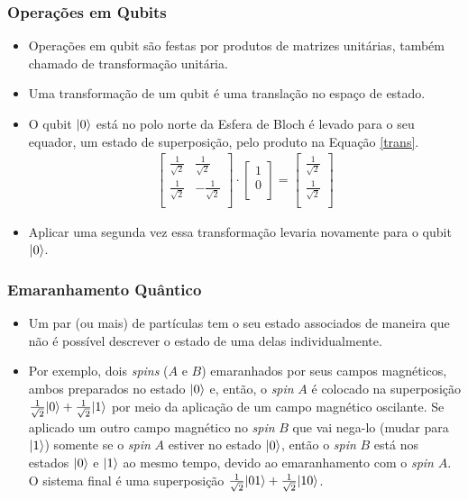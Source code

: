 \documentclass{beamer}
\DeclarePairedDelimiter\ket{\lvert}{\rangle}
\begin{document}
\begin{frame}
\frametitle{Operações em Qubits}
\begin{itemize}
  \item Operações em qubit são festas por produtos de matrizes unitárias, também chamado
  de transformação unitária.
  \item Uma transformação de um qubit é uma translação no espaço de estado.
  \item O qubit $\ket{0}$ está no polo norte da Esfera de Bloch é
    levado para o seu equador, um estado de superposição, pelo produto
    na Equação \ref{trans}.
       \begin{align}
         \label{trans}
       \begin{bmatrix} 
                 \frac{1}{\sqrt{2}} & \frac{1}{\sqrt{2}}\\ 
                 \frac{1}{\sqrt{2}} & -\frac{1}{\sqrt{2}}\\ 
       \end{bmatrix}
         \cdot
       \begin{bmatrix} 
                 1 \\ 
                 0 \\ 
       \end{bmatrix}
         =
       \begin{bmatrix} 
                \frac{1}{\sqrt{2}} \\ 
                \frac{1}{\sqrt{2}} \\ 
       \end{bmatrix}
       \end{align}
  \item Aplicar uma segunda vez essa transformação levaria novamente para o qubit $\ket{0}$.
\end{itemize}
\end{frame}

\begin{frame}
\frametitle{Emaranhamento Quântico}
\begin{itemize}
  \item Um par (ou mais) de partículas tem o seu estado associados de
  maneira que não é possível descrever o estado de uma delas
  individualmente.
  \item Por exemplo, dois \textit{spins} ($A$ e $B$) emaranhados por
seus campos magnéticos, ambos preparados no estado $\ket{0}$ e, então,
o \textit{spin} $A$ é colocado na superposição
$\frac{1}{\sqrt{2}} \ket{0} + \frac{1}{\sqrt{2}} \ket{1}$ por meio da
aplicação de um campo magnético oscilante. Se aplicado um outro campo
magnético no \textit{spin} $B$ que vai nega-lo (mudar para
$\ket{1}$) somente se o \textit{spin} $A$ estiver no estado $\ket{0}$,
então o \textit{spin} $B$ está nos estados $\ket{0}$ e $\ket{1}$ ao
mesmo tempo, devido ao emaranhamento com o \textit{spin} $A$. O sistema
final é uma superposição
$\frac{1}{\sqrt{2}} \ket{01} + \frac{1}{\sqrt{2}} \ket{10}$.
\end{itemize}
\end{frame}
\end{document}
